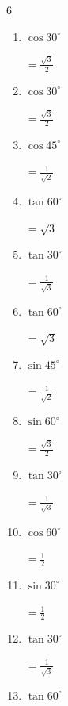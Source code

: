 \begin{multicols}{6}
\begin{enumerate}
        $\displaystyle =\frac{\sqrt{3}}{2}$

  \item $\displaystyle \cos{30^\circ}$

        $\displaystyle =\frac{\sqrt{3}}{2}$

  \item $\displaystyle \cos{30^\circ}$

        $\displaystyle =\frac{\sqrt{3}}{2}$

  \item $\displaystyle \cos{45^\circ}$

        $\displaystyle =\frac{1}{\sqrt{2}}$

  \item $\displaystyle \tan{60^\circ}$

        $\displaystyle =\sqrt{3}$

  \item $\displaystyle \tan{30^\circ}$

        $\displaystyle =\frac{1}{\sqrt{3}}$

  \item $\displaystyle \tan{60^\circ}$

        $\displaystyle =\sqrt{3}$

\columnbreak %

  \item $\displaystyle \sin{45^\circ}$

        $\displaystyle =\frac{1}{\sqrt{2}}$

  \item $\displaystyle \sin{60^\circ}$

        $\displaystyle =\frac{\sqrt{3}}{2}$

  \item $\displaystyle \tan{30^\circ}$

        $\displaystyle =\frac{1}{\sqrt{3}}$

  \item $\displaystyle \cos{60^\circ}$

        $\displaystyle =\frac{1}{2}$

  \item $\displaystyle \sin{30^\circ}$

        $\displaystyle =\frac{1}{2}$

  \item $\displaystyle \tan{30^\circ}$

        $\displaystyle =\frac{1}{\sqrt{3}}$

  \item $\displaystyle \tan{60^\circ}$


\end{enumerate}
\end{multicols}
